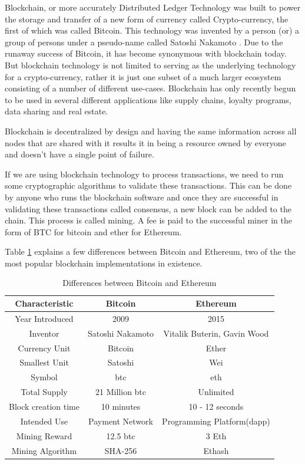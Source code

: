 \documentclass[11pt,openright]{report}
\begin{document}
Blockchain, or more accurately Distributed Ledger Technology was built to power the storage and transfer of a new form of currency called Crypto-currency, the first of which was called Bitcoin. This technology was invented by a person (or) a group of persons under a pseudo-name called Satoshi Nakamoto \cite{nakamoto2012bitcoin}. Due to the runaway success of Bitcoin, it has become synonymous with blockchain today. But blockchain technology is not limited to serving as the underlying technology for a crypto-currency, rather it is just one subset of a much larger ecosystem consisting of a number of different use-cases. Blockchain has only recently begun to be used in several different applications like supply chains, loyalty programs, data sharing and real estate.

Blockchain is decentralized by design\cite{gencer2018decentralization} and having the same information across all nodes that are shared with it results it in being a resource owned by everyone and doesn’t have a single point of failure. 

If we are using blockchain technology to process transactions, we need to run some cryptographic algorithms to validate these transactions. This can be done by anyone who runs the blockchain software and once they are successful in validating these transactions called consensus, a new block can be added to the chain. This process is called mining. A fee is paid to the successful miner in the form of BTC for bitcoin and ether for Ethereum.

Table \ref{differences_bitcoin_ethereum} explains a few differences between Bitcoin and Ethereum, two of the the most popular blockchain implementations in existence.
 
\begin{table}[!htbp]
	\renewcommand{\arraystretch}{1.3}
	\caption{Differences between Bitcoin and Ethereum}
	\label{differences_bitcoin_ethereum}
	\centering
	\begin{tabular}{|c||c|c|}
		\hline
		\bfseries Characteristic & \bfseries Bitcoin & \bfseries Ethereum\\
		\hline\hline
	    Year Introduced & 2009 & 2015\\ \hline
	    Inventor & Satoshi Nakamoto & Vitalik Buterin, Gavin Wood\\ \hline
	    Currency Unit & Bitcoin & Ether\\ \hline
	    Smallest Unit & Satoshi & Wei\\ \hline
	    Symbol & btc & eth \\ \hline
	    Total Supply & 21 Million btc & Unlimited\\ \hline
	    Block creation time & 10 minutes & 10 - 12 seconds\\ \hline
	    Intended Use & Payment Network & Programming Platform(dapp)\\ \hline
	    Mining Reward & 12.5 btc & 3 Eth \\ \hline
        Mining Algorithm & SHA-256 & Ethash \\ \hline
	\end{tabular}
\end{table}
\newpage
\end{document}

